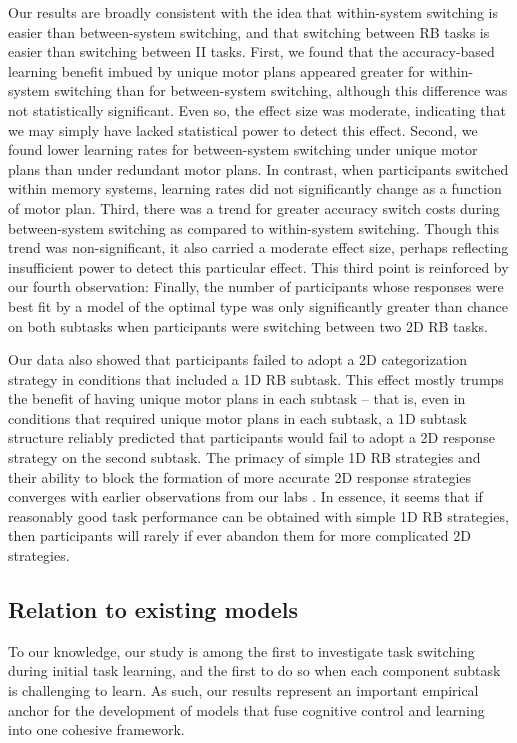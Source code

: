 \documentclass[doc, floatsintext]{apa7}
\begin{document}
Our results are broadly consistent with the idea that
within-system switching is easier than between-system
switching, and that switching between RB tasks is easier
than switching between II tasks.  First, we found that the
accuracy-based learning benefit imbued by unique motor plans
appeared greater for within-system switching than for
between-system switching, although this difference was not
statistically significant.  Even so, the effect size was
moderate, indicating that we may simply have lacked
statistical power to detect this effect.   Second, we found
lower learning rates for between-system switching under
unique motor plans than under redundant motor plans.  In
contrast, when participants switched within memory systems,
learning rates did not significantly change as a function of
motor plan.  Third, there was a trend for greater accuracy
switch costs during between-system switching as compared to
within-system switching. Though this trend was
non-significant, it also carried a moderate effect size,
perhaps reflecting insufficient power to detect this
particular effect. This third point is reinforced by our
fourth observation:  Finally, the number of participants
whose responses were best fit by a model of the optimal type
was only significantly greater than chance on both subtasks
when participants were switching between two 2D RB tasks.

Our data also showed that participants failed to adopt a 2D
categorization strategy in conditions that included a 1D RB
subtask. This effect mostly trumps the benefit of having
unique motor plans in each subtask -- that is, even in
conditions that required unique motor plans in each subtask,
a 1D subtask structure reliably predicted that participants
would fail to adopt a 2D response strategy on the second
subtask. The primacy of simple 1D RB strategies and their
ability to block the formation of more accurate 2D response
strategies converges with earlier observations from our labs
\cite{gregory_ashby_interactions_2010}. In essence, it seems
that if reasonably good task performance can be obtained
with simple 1D RB strategies, then participants will rarely
if ever abandon them for more complicated 2D strategies.

\subsection{Relation to existing models}
To our knowledge, our study is among the first to
investigate task switching during initial task learning, and
the first to do so when each component subtask is
challenging to learn. As such, our results represent an
important empirical anchor for the development of models
that fuse cognitive control and learning into one cohesive
framework. 
\end{document}
